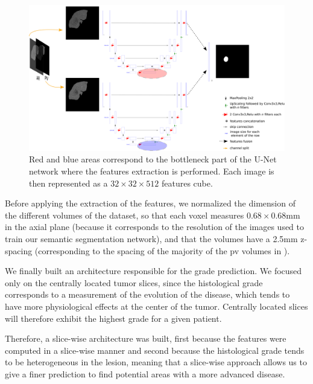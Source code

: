 \begin{figure}[th!]
\centering
\includegraphics[width=0.95\linewidth]{../HistologicalGradePrediction/images/MPF_Features_Selection}
\caption{Red and blue areas correspond to the bottleneck part of the U-Net
network where the features extraction is performed. Each image is then
represented as a $ 32\times32\times512 $ features cube.}
\label{fig:MPF_Features_Selection}
\end{figure}


Before applying the extraction of the features, we normalized
the dimension of the different volumes of the dataset, so that each
voxel measures $ 0.68\times0.68 $mm in the axial plane (because it corresponds to
the resolution of the images used to train our semantic segmentation
network), and that the volumes have a 2.5mm z-spacing (corresponding to the
spacing of the majority of the \ac{pv} volumes in \textbf{}).

We finally built an architecture responsible for the grade prediction.
We focused only on the centrally located tumor slices, since the
histological grade corresponds to a measurement of the evolution of the
disease, which tends to have more physiological effects at the center of
the tumor. Centrally located slices will therefore exhibit the highest
grade for a given patient.

Therefore, a slice-wise architecture was built, first because the
features were computed in a slice-wise manner and second because the
histological grade tends to be heterogeneous in the lesion, meaning that
a slice-wise approach allows us to give a finer prediction to find
potential areas with a more advanced disease.


